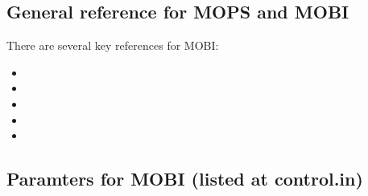 \documentclass[a4paper]{article}
\def\noin{\noindent }
\begin{document}
\subsection{General reference for MOPS and MOBI}

\noin There are several key references for MOBI:
\begin{itemize}
\item {}
\item {}
\item {}
\item {}
\item {}
\end{itemize}

\subsection{Paramters for MOBI (listed at control.in)}
\end{document}
